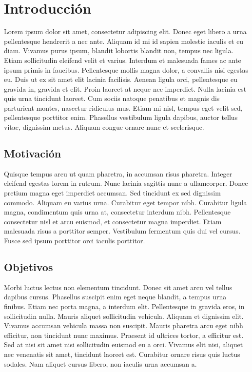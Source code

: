\chapter{Introducción}

Lorem ipsum dolor sit amet, consectetur adipiscing elit. Donec eget libero a urna pellentesque hendrerit a nec ante. Aliquam id mi id sapien molestie iaculis et eu diam. Vivamus purus ipsum, blandit lobortis blandit non, tempus nec ligula. Etiam sollicitudin eleifend velit et varius. Interdum et malesuada fames ac ante ipsum primis in faucibus. Pellentesque mollis magna dolor, a convallis nisi egestas eu. Duis ut ex sit amet elit lacinia facilisis. Aenean ligula orci, pellentesque eu gravida in, gravida et elit. Proin laoreet at neque nec imperdiet. Nulla lacinia est quis urna tincidunt laoreet. Cum sociis natoque penatibus et magnis dis parturient montes, nascetur ridiculus mus. Etiam mi nisl, tempus eget velit sed, pellentesque porttitor enim. Phasellus vestibulum ligula dapibus, auctor tellus vitae, dignissim metus. Aliquam congue ornare nunc et scelerisque.

\section{Motivación}

Quisque tempus arcu ut quam pharetra, in accumsan risus pharetra. Integer eleifend egestas lorem in rutrum. Nunc lacinia sagittis nunc a ullamcorper. Donec pretium magna eget imperdiet accumsan. Sed tincidunt ex sed dignissim commodo. Aliquam eu varius urna. Curabitur eget tempor nibh. Curabitur ligula magna, condimentum quis urna at, consectetur interdum nibh. Pellentesque consectetur nisl et arcu euismod, et consectetur magna imperdiet. Etiam malesuada risus a porttitor semper. Vestibulum fermentum quis dui vel cursus. Fusce sed ipsum porttitor orci iaculis porttitor.

\section{Objetivos}

Morbi luctus lectus non elementum tincidunt. Donec sit amet arcu vel tellus dapibus cursus. Phasellus suscipit enim eget neque blandit, a tempus urna finibus. Etiam nec porta magna, a interdum elit. Pellentesque in gravida eros, in sollicitudin nulla. Mauris aliquet sollicitudin vehicula. Aliquam et dignissim elit. Vivamus accumsan vehicula massa non suscipit. Mauris pharetra arcu eget nibh efficitur, non tincidunt nunc maximus. Praesent id ultrices tortor, a efficitur est. Sed at nisi sit amet nisi sollicitudin euismod eu a orci. Vivamus elit nisi, aliquet nec venenatis sit amet, tincidunt laoreet est. Curabitur ornare risus quis luctus sodales. Nam aliquet cursus libero, non iaculis urna accumsan a.

